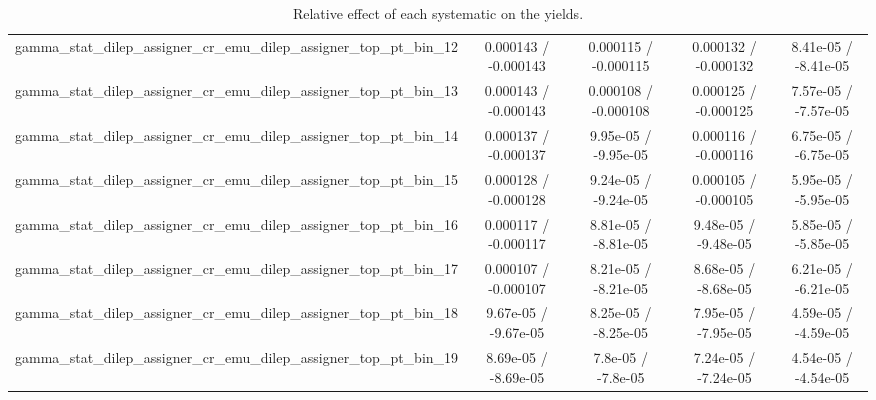 \documentclass[10pt]{article}
\begin{document}
\begin{table}[htbp]
\begin{center}
\begin{tabular}{|c|c|c|c|c|}
  gamma_stat_dilep_assigner_cr_emu_dilep_assigner_top_pt_bin_12 & 0.000143 / -0.000143 & 0.000115 / -0.000115 & 0.000132 / -0.000132 & 8.41e-05 / -8.41e-05 \\ 
  gamma_stat_dilep_assigner_cr_emu_dilep_assigner_top_pt_bin_13 & 0.000143 / -0.000143 & 0.000108 / -0.000108 & 0.000125 / -0.000125 & 7.57e-05 / -7.57e-05 \\ 
  gamma_stat_dilep_assigner_cr_emu_dilep_assigner_top_pt_bin_14 & 0.000137 / -0.000137 & 9.95e-05 / -9.95e-05 & 0.000116 / -0.000116 & 6.75e-05 / -6.75e-05 \\ 
  gamma_stat_dilep_assigner_cr_emu_dilep_assigner_top_pt_bin_15 & 0.000128 / -0.000128 & 9.24e-05 / -9.24e-05 & 0.000105 / -0.000105 & 5.95e-05 / -5.95e-05 \\ 
  gamma_stat_dilep_assigner_cr_emu_dilep_assigner_top_pt_bin_16 & 0.000117 / -0.000117 & 8.81e-05 / -8.81e-05 & 9.48e-05 / -9.48e-05 & 5.85e-05 / -5.85e-05 \\ 
  gamma_stat_dilep_assigner_cr_emu_dilep_assigner_top_pt_bin_17 & 0.000107 / -0.000107 & 8.21e-05 / -8.21e-05 & 8.68e-05 / -8.68e-05 & 6.21e-05 / -6.21e-05 \\ 
  gamma_stat_dilep_assigner_cr_emu_dilep_assigner_top_pt_bin_18 & 9.67e-05 / -9.67e-05 & 8.25e-05 / -8.25e-05 & 7.95e-05 / -7.95e-05 & 4.59e-05 / -4.59e-05 \\ 
  gamma_stat_dilep_assigner_cr_emu_dilep_assigner_top_pt_bin_19 & 8.69e-05 / -8.69e-05 & 7.8e-05 / -7.8e-05 & 7.24e-05 / -7.24e-05 & 4.54e-05 / -4.54e-05 \\ 
\hline 
\end{tabular} 
\caption{Relative effect of each systematic on the yields.} 
\end{center} 
\end{table} 
\end{document}
